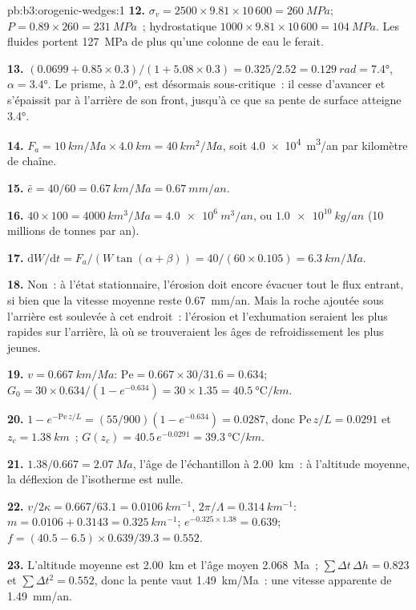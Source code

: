\begin{solution}{pb:b3:orogenic-wedges:1}
\textbf{12.} $\sigma_v = 2500\times9.81\times10\,600 = \qty{260}{MPa}$; $P =
0.89\times260 = \qty{231}{MPa}$~; hydrostatique $1000\times9.81\times10\,600 =
\qty{104}{MPa}$. Les fluides portent \qty{127}{MPa} de plus qu'une colonne de
eau le ferait.

\textbf{13.} $(0.0699 + 0.85\times0.3)/(1 + 5.08\times0.3) = 0.325/2.52 =
\qty{0.129}{rad} = \ang{7.4}$, $\alpha = \ang{3.4}$. Le prisme, à \ang{2.0},
est désormais sous-critique~: il cesse d'avancer et s'épaissit par  à l'arrière de son front, jusqu'à ce que sa pente de surface atteigne \ang{3.4}.

\textbf{14.} $F_a = \qty{10}{km/Ma}\times\qty{4.0}{km} = \qty{40}{km^2/Ma}$,
soit \qty{4.0e4}{m^3/an} par kilomètre de chaîne.

\textbf{15.} $\bar e = 40/60 = \qty{0.67}{km/Ma} = \qty{0.67}{mm/an}$.

\textbf{16.} $40\times100 = \qty{4000}{km^3/Ma} = \qty{4.0e6}{m^3/an}$, ou
$\qty{1.0e10}{kg/an}$ (10 millions de tonnes par an).

\textbf{17.} $\mathrm dW/\mathrm dt = F_a/(W\tan(\alpha + \beta)) =
40/(60\times0.105) = \qty{6.3}{km/Ma}$.

\textbf{18.} Non~: à l'état stationnaire, l'érosion doit encore évacuer tout le
flux entrant, si bien que la vitesse moyenne reste \qty{0.67}{mm/an}. Mais la roche ajoutée
sous l'arrière est soulevée à cet endroit~: l'érosion et l'exhumation seraient les plus rapides
sur l'arrière, là où se trouveraient les âges de refroidissement les plus jeunes.

\textbf{19.} $v = \qty{0.667}{km/Ma}$: $\mathrm{Pe} = 0.667\times30/31.6 =
0.634$; $G_0 = 30\times0.634/(1 - e^{-0.634}) = 30\times1.35 =
\qty{40.5}{\celsius/km}$.

\textbf{20.} $1 - e^{-\mathrm{Pe}\,z/L} = (55/900)(1 - e^{-0.634}) = 0.0287$,
donc $\mathrm{Pe}\,z/L = 0.0291$ et $z_c = \qty{1.38}{km}$~; $G(z_c) =
40.5\,e^{-0.0291} = \qty{39.3}{\celsius/km}$.

\textbf{21.} $1.38/0.667 = \qty{2.07}{Ma}$, l'âge de l'échantillon à
\qty{2.00}{km}~: à l'altitude moyenne, la déflexion de l'isotherme est nulle.

\textbf{22.} $v/2\kappa = 0.667/63.1 = \qty{0.0106}{km^{-1}}$, $2\pi/\Lambda =
\qty{0.314}{km^{-1}}$: $m = 0.0106 + 0.3143 = \qty{0.325}{km^{-1}}$;
$e^{-0.325\times1.38} = 0.639$; $f = (40.5 - 6.5)\times0.639/39.3 = 0.552$.

\textbf{23.} L'altitude moyenne est \qty{2.00}{km} et l'âge moyen
\qty{2.068}{Ma}~; $\sum\Delta t\,\Delta h = 0.823$ et $\sum\Delta t^2 =
0.552$, donc la pente vaut \qty{1.49}{km/Ma}~: une vitesse apparente de
\qty{1.49}{mm/an}.


\end{solution}
